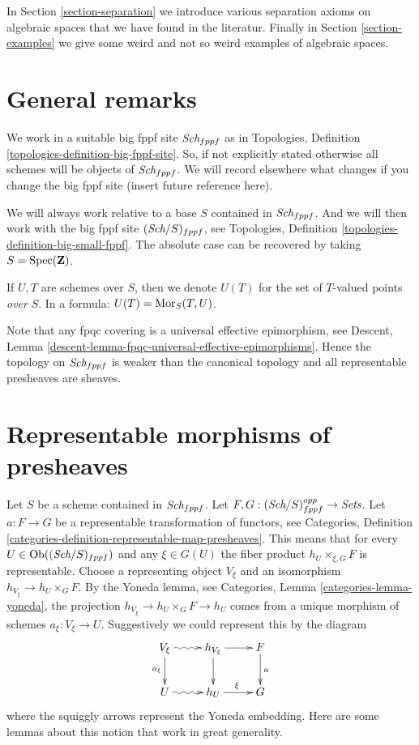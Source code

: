\medskip\noindent
In Section \ref{section-separation} we introduce various separation
axioms on algebraic spaces that we have found in the literatur.
Finally in Section \ref{section-examples}
we give some weird and not so weird examples of algebraic spaces.






\section{General remarks}
\label{section-general}

\noindent
We work in a suitable big fppf site $\textit{Sch}_{fppf}$
as in Topologies, Definition \ref{topologies-definition-big-fppf-site}.
So, if not explicitly stated otherwise all schemes will be objects
of $\textit{Sch}_{fppf}$.
We will record elsewhere what changes if you change the big
fppf site (insert future reference here).

\medskip\noindent
We will always work relative to a base $S$ contained in $\textit{Sch}_{fppf}$.
And we will then work with the big fppf site $(\textit{Sch}/S)_{fppf}$,
see Topologies, Definition \ref{topologies-definition-big-small-fppf}.
The absolute case can be recovered by taking
$S = \mathop{\rm Spec}(\mathbf{Z})$.

\medskip\noindent
If $U, T$ are schemes over $S$, then we denote
$U(T)$ for the set of $T$-valued points {\it over} $S$.
In a formula: $U(T) = \mathop{\rm Mor}\nolimits_S(T, U)$.

\medskip\noindent
Note that any fpqc covering is a universal effective epimorphism, see
Descent, Lemma \ref{descent-lemma-fpqc-universal-effective-epimorphisms}.
Hence the topology on $\textit{Sch}_{fppf}$
is weaker than the canonical topology and all representable presheaves
are sheaves.







\section{Representable morphisms of presheaves}
\label{section-representable}

\noindent
Let $S$ be a scheme contained in $\textit{Sch}_{fppf}$.
Let $F, G : (\textit{Sch}/S)_{fppf}^{opp} \to \textit{Sets}$.
Let $a : F \to G$ be a representable transformation of functors, see
Categories,
Definition \ref{categories-definition-representable-map-presheaves}.
This means that for every
$U \in \mathop{\rm Ob}\nolimits((\textit{Sch}/S)_{fppf})$ and
any $\xi \in G(U)$ the fiber product $h_U \times_{\xi, G} F$ is representable.
Choose a representing object $V_\xi$ and an isomorphism
$h_{V_\xi} \to h_U \times_G F$.
By the Yoneda lemma, see Categories, Lemma \ref{categories-lemma-yoneda},
the projection $h_{V_\xi} \to h_U \times_G F \to h_U$ comes from a unique
morphism of schemes $a_\xi : V_\xi \to U$.
Suggestively we could represent this by the diagram
$$
\xymatrix{
V_\xi \ar@{~>}[r] \ar[d]_{a_\xi} & h_{V_\xi} \ar[d] \ar[r] & F \ar[d]^a \\
U \ar@{~>}[r] & h_U \ar[r]^\xi & G
}
$$
where the squiggly arrows represent the Yoneda embedding.
Here are some lemmas about this notion that work in great generality.

